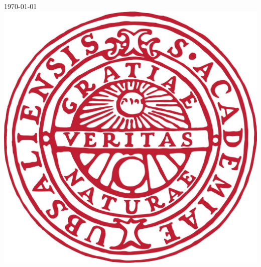 \documentclass[a4paper, 12pt]{article}
\begin{document}
\begin{titlepage}


{\large \today}\\[2cm] %


\includegraphics[scale = 0.11]{figures/uulogga.png}\\[1cm] %
 

\vfill %

\end{titlepage}
\newpage
\end{document}
